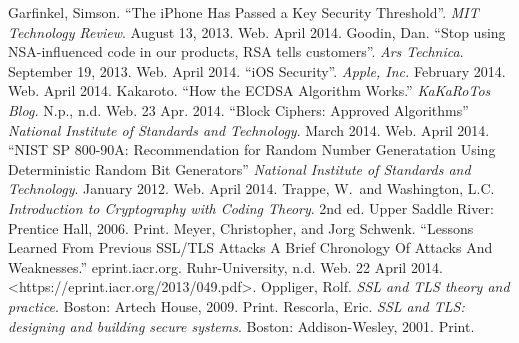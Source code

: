 \begin{thebibliography}{1}
 Garfinkel, Simson. ``The iPhone Has Passed a Key Security Threshold''. \textit{MIT Technology Review}. August 13, 2013. Web. April 2014.
 Goodin, Dan. ``Stop using NSA-influenced code in our products, RSA tells customers''. \textit{Ars Technica}. September 19, 2013. Web. April 2014.
 ``iOS Security''. \textit{Apple, Inc.} February 2014. Web. April 2014.
 Kakaroto. ``How the ECDSA Algorithm Works.'' \textit{KaKaRoTos Blog.} N.p., n.d. Web. 23 Apr. 2014.
 ``Block Ciphers: Approved Algorithms'' \textit{National Institute of Standards and Technology}. March 2014. Web. April 2014.
 ``NIST SP 800-90A: Recommendation for Random Number Generatation Using Deterministic Random Bit Generators'' \textit{National Institute of Standards and Technology}. January 2012. Web. April 2014.
 Trappe, W.\ and Washington, L.C. \textit{Introduction to Cryptography with Coding Theory}. 2nd ed. Upper Saddle River: Prentice Hall, 2006. Print.
 Meyer, Christopher, and Jorg Schwenk. ``Lessons Learned From Previous SSL/TLS Attacks A Brief Chronology Of Attacks And Weaknesses.'' eprint.iacr.org. Ruhr-University, n.d. Web. 22 April 2014. <https://eprint.iacr.org/2013/049.pdf>.
 Oppliger, Rolf. \textit{SSL and TLS theory and practice}. Boston: Artech House, 2009. Print.
 Rescorla, Eric. \textit{SSL and TLS: designing and building secure systems}. Boston: Addison-Wesley, 2001. Print.
\end{thebibliography}
